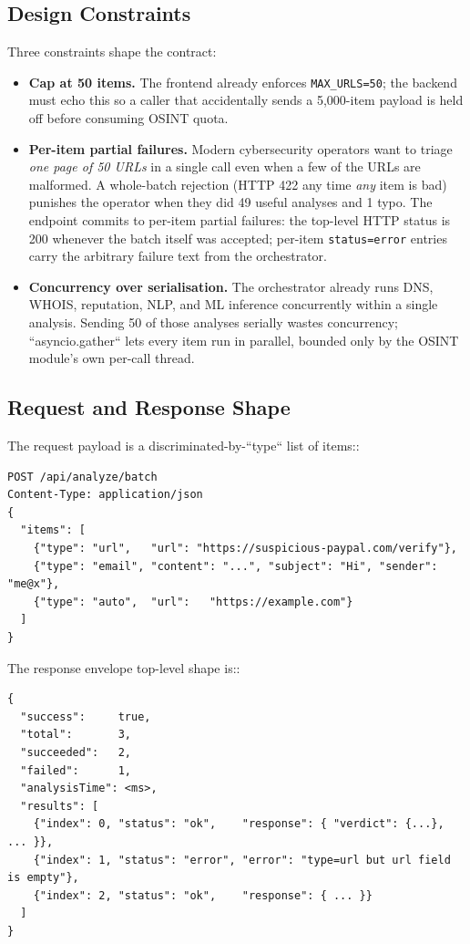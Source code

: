 \subsection{Design Constraints}

Three constraints shape the contract:

\begin{itemize}
\item
  \textbf{Cap at 50 items.}  The frontend already enforces
  \texttt{MAX\_URLS=50}; the backend must echo this so a caller
  that accidentally sends a 5,000-item payload is held off before
  consuming OSINT quota.
\item
  \textbf{Per-item partial failures.}  Modern cybersecurity
  operators want to triage \emph{one page of 50 URLs} in a single
  call even when a few of the URLs are malformed.  A whole-batch
  rejection (HTTP 422 any time \emph{any} item is bad) punishes the
  operator when they did 49 useful analyses and 1 typo.  The
  endpoint commits to per-item partial failures: the top-level
  HTTP status is 200 whenever the batch itself was accepted;
  per-item \texttt{status=error} entries carry the arbitrary failure
  text from the orchestrator.
\item
  \textbf{Concurrency over serialisation.}  The orchestrator
  already runs DNS, WHOIS, reputation, NLP, and ML inference
  concurrently within a single analysis.  Sending 50 of those
  analyses serially wastes concurrency; ``asyncio.gather`` lets
  every item run in parallel, bounded only by the OSINT module's
  own per-call thread.
\end{itemize}

\subsection{Request and Response Shape}

The request payload is a discriminated-by-``type`` list of items::

\begin{verbatim}
POST /api/analyze/batch
Content-Type: application/json
{
  "items": [
    {"type": "url",   "url": "https://suspicious-paypal.com/verify"},
    {"type": "email", "content": "...", "subject": "Hi", "sender": "me@x"},
    {"type": "auto",  "url":   "https://example.com"}
  ]
}
\end{verbatim}

The response envelope top-level shape is::

\begin{verbatim}
{
  "success":     true,
  "total":       3,
  "succeeded":   2,
  "failed":      1,
  "analysisTime": <ms>,
  "results": [
    {"index": 0, "status": "ok",    "response": { "verdict": {...}, ... }},
    {"index": 1, "status": "error", "error": "type=url but url field is empty"},
    {"index": 2, "status": "ok",    "response": { ... }}
  ]
}
\end{verbatim}

